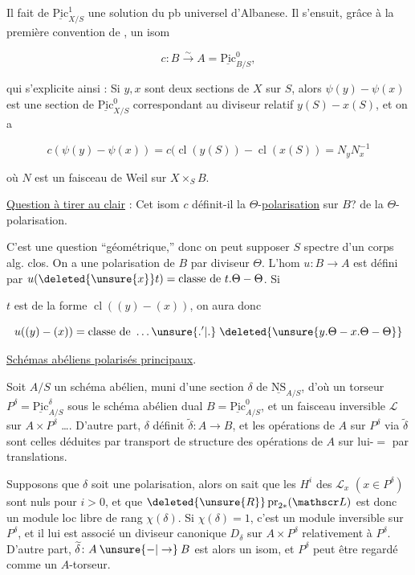 Il fait de $\underline{\mathrm{Pic}}^1_{X/S}$ une solution du pb universel d'Albanese. Il s'ensuit, grâce à la première convention de , un isom

\[
c\colon B\xrightarrow{\sim} A=\underline{\mathrm{Pic}}^0_{B/S},
\]

qui s'explicite ainsi : Si $y,x$ sont deux sections de $X$ sur $S$, alors $\psi(y)-\psi(x)$ est une section de $\underline{\mathrm{Pic}}^0_{X/S}$ correspondant au diviseur relatif $y(S)-x(S)$, et on a

\[
c(\psi(y)-\psi(x))=c(\operatorname{cl}(y(S))-\operatorname{cl}(x(S))=N_yN_x^{-1}
\]

où $N$ est un faisceau de Weil sur $X\times_S B$.

\uline{Question à tirer au clair} : Cet isom $c$ définit-il  la $\Theta$-\uline{polarisation} sur $B$?   de la $\Theta$-polarisation.

C'est une question ``géométrique,'' donc on peut supposer $S$ spectre d'un corps alg. clos. On a une polarisation de $B$ par   diviseur $\Theta$. L'hom  $u\colon B\longrightarrow A$ est défini par $u(\deleted{\unsure{x}}t)=\text{classe de }t.\Theta-\Theta$. Si

$t$ est de la forme $\operatorname{cl}((y)-(x))$, on aura donc

\[
u((y)-(x))=\text{classe de }\ldots\unsure{.'|.}\;\deleted{\unsure{y.\Theta-x.\Theta-\Theta}}
\]


\uline{Schémas abéliens polarisés principaux}.

Soit $A/S$ un schéma abélien, muni d'une section $\delta$ de $\underline{\mathrm{NS}}_{A/S}$, d'où un torseur $P^\delta=\underline{\mathrm{Pic}}^\delta_{A/S}$ sous le schéma abélien dual $B=\underline{\mathrm{Pic}}^0_{A/S}$, et un faisceau inversible $\mathscr L$ sur $A\times P^\delta$ \ldots. D'autre part, $\delta$ définit $\widetilde\delta\colon A\longrightarrow B$, et les opérations de $A$ sur $P^\delta$ via $\widetilde\delta$ sont celles déduites par transport de structure des opérations de $A$ sur lui-$=$ par translations.

Supposons que $\delta$ soit une polarisation,  alors on sait que les $H^i$ des $\mathscr L_x$ $(x\in P^\delta)$ sont nuls pour $i>0$, et que $\deleted{\unsure{R}}\operatorname{pr}_{2*}(\mathscr L)$ est donc un module loc libre de rang $\chi(\delta)$. Si $\chi(\delta)=1$, c'est un module inversible sur $P^\delta$, et il lui est associé un diviseur canonique $D_\delta$ \deleted{$\unsure{\Theta_\delta|\Theta}$} sur $A\times P^\delta$ relativement à $P^\delta$. D'autre part, $\widetilde\delta\colon A\mathbin{\unsure{-|\to}}B$ est alors un isom, et $P^\delta$ peut être regardé comme un $A$-torseur.

